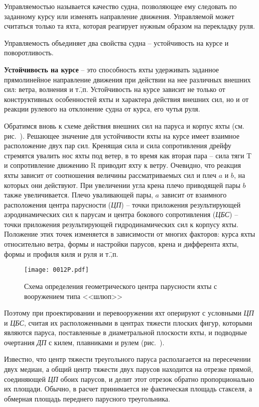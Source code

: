 Управляемостью называется качество судна, позволяющее ему следовать по заданному курсу или изменять направление движения. Управляемой может считаться только та яхта, которая реагирует нужным образом на перекладку руля.

Управляемость объединяет два свойства судна \--- устойчивость на курсе и поворотливость.

\textbf{Устойчивость на курсе} \--- это способность яхты удерживать заданное прямолинейное направление движения при действии на нее различных внешних сил: ветра, волнения и т.\=,п. Устойчивость на курсе зависит не только от конструктивных особенностей яхты и характера действия внешних сил, но и от реакции рулевого на отклонение судна от курса, его чутья руля.

Обратимся вновь к схеме действия внешних сил на паруса и корпус яхты (см. рис.~). Решающее значение для устойчивости яхты на курсе имеет взаимное расположение двух пар сил. Кренящая сила  и сила сопротивления дрейфу  стремятся увалить нос яхты под ветер, в то время как вторая пара \--- сила тяги \ve T и сопротивление движению \ve R приводит яхту к ветру. Очевидно, что реакция яхты зависит от соотношения величины рассматриваемых сил и плеч $a$ и $b$, на которых они действуют. При увеличении угла крена плечо приводящей пары $b$ также увеличивается. Плечо уваливающей пары, $a$ зависит от взаимного расположения центра парусности (\textit{ЦП}) \--- точки приложения результирующей аэродинамических сил к парусам и центра бокового сопротивления (\textit{ЦБС}) \--- точки приложения результирующей гидродинамических сил к корпусу яхты. Положение этих точек изменяется в зависимости от многих факторов: курса яхты относительно ветра, формы и настройки парусов, крена и дифферента яхты, формы и профиля киля и руля и т.\=,п.

\begin{figure}[htb]
  \centering
  \texttt{[image: 0012P.pdf]}
  \caption{Схема определения геометрического центра парусности яхты с вооружением типа <<шлюп>>}
  \label{fig:12}
\end{figure}

Поэтому при проектировании и перевооружении яхт оперируют с условными \textit{ЦП} и \textit{ЦБС}, считая их расположенными в центрах тяжести плоских фигур, которыми являются паруса, поставленные в диаметральной плоскости яхты, и подводные очертания \textit{ДП} с килем, плавниками и рулем (рис.~). 

Известно, что центр тяжести треугольного паруса располагается на пересечении двух медиан, а общий центр тяжести двух парусов находится на отрезке прямой, соединяющей \textit{ЦП} обоих парусов, и делит этот отрезок обратно пропорционально их площади. Обычно, в расчет принимается не фактическая площадь стакселя, а обмерная площадь переднего парусного треугольника. 

